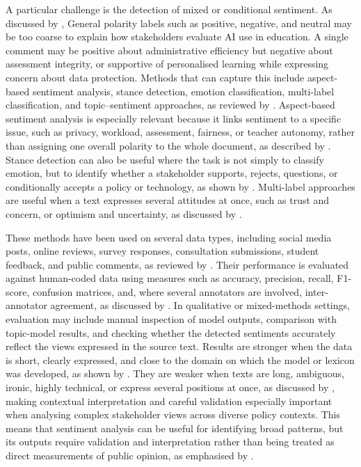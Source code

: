 A particular challenge is the detection of mixed or conditional sentiment. As
discussed by \cite{liu2012sentiment, mao2024sentiment}, General polarity labels such
as positive, negative, and neutral may be too coarse to explain how stakeholders
evaluate AI use in education. A single comment may be positive about administrative
efficiency but negative about assessment integrity, or supportive of personalised
learning while expressing concern about data protection. Methods that can capture
this include aspect-based sentiment analysis, stance detection, emotion
classification, multi-label classification, and topic--sentiment approaches, as
reviewed by \cite{tan2023survey,mao2024sentiment}. Aspect-based sentiment analysis is
especially relevant because it links sentiment to a specific issue, such as privacy,
workload, assessment, fairness, or teacher autonomy, rather than assigning one
overall polarity to the whole document, as described by \cite{liu2012sentiment}.
Stance detection can also be useful where the task is not simply to classify emotion,
but to identify whether a stakeholder supports, rejects, questions, or conditionally
accepts a policy or technology, as shown by \cite{mohammad2016stance}. Multi-label
approaches are useful when a text expresses several attitudes at once, such as trust
and concern, or optimism and uncertainty, as discussed by \cite{yu2018multilabel}.


These methods have been used on several data types, including social media posts,
online reviews, survey responses, consultation submissions, student feedback, and
public comments, as reviewed by \cite{tan2023survey,mao2024sentiment}. Their
performance is evaluated against human-coded data using measures such as accuracy,
precision, recall, F1-score, confusion matrices, and, where several annotators are
involved, inter-annotator agreement, as discussed by
\cite{pang2008opinion,mao2024sentiment}. In qualitative or mixed-methods settings,
evaluation may include manual inspection of model outputs, comparison with
topic-model results, and checking whether the detected sentiments accurately reflect
the views expressed in the source text. Results are stronger when the data is short,
clearly expressed, and close to the domain on which the model or lexicon was
developed, as shown by \cite{hutto2014vader,blitzer2007domain}. They are weaker when
texts are long, ambiguous, ironic, highly technical, or express several positions at
once, as discussed by \cite{pang2008opinion,hutto2014vader}, making contextual
interpretation and careful validation especially important when analysing complex
stakeholder views across diverse policy contexts. This means that sentiment analysis
can be useful for identifying broad patterns, but its outputs require validation and
interpretation rather than being treated as direct measurements of public opinion, as
emphasised by \cite{pang2008opinion,liu2012sentiment}.


